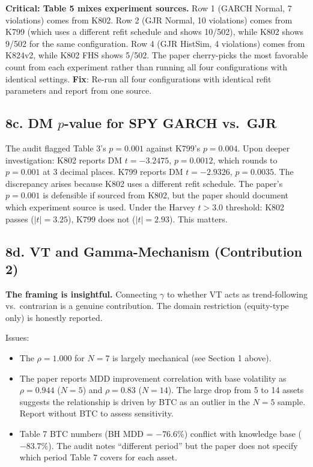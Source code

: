 \documentclass[12pt,a4paper]{article}
\begin{document}
\textcolor{errorred}{\textbf{Critical: Table 5 mixes experiment sources.}} Row 1 (GARCH Normal, 7 violations) comes from K802. Row 2 (GJR Normal, 10 violations) comes from K799 (which uses a different refit schedule and shows 10/502), while K802 shows 9/502 for the same configuration. Row 4 (GJR HistSim, 4 violations) comes from K824v2, while K802 FHS shows 5/502. The paper cherry-picks the most favorable count from each experiment rather than running all four configurations with identical settings. \textbf{Fix}: Re-run all four configurations with identical refit parameters and report from one source.

\subsection*{8c. DM $p$-value for SPY GARCH vs.\ GJR}

The audit flagged Table 3's $p = 0.001$ against K799's $p = 0.004$. Upon deeper investigation: K802 reports DM $t = -3.2475$, $p = 0.0012$, which rounds to $p = 0.001$ at 3 decimal places. K799 reports DM $t = -2.9326$, $p = 0.0035$. The discrepancy arises because K802 uses a different refit schedule. The paper's $p = 0.001$ is defensible if sourced from K802, but the paper should document which experiment source is used. Under the Harvey $t > 3.0$ threshold: K802 passes ($|t| = 3.25$), K799 does not ($|t| = 2.93$). This matters.

\subsection*{8d. VT and Gamma-Mechanism (Contribution 2)}

\textcolor{okgreen}{\textbf{The framing is insightful.}} Connecting $\gamma$ to whether VT acts as trend-following vs.\ contrarian is a genuine contribution. The domain restriction (equity-type only) is honestly reported.

Issues:
\begin{itemize}[nosep]
\item The $\rho = 1.000$ for $N = 7$ is largely mechanical (see Section 1 above).
\item The paper reports MDD improvement correlation with base volatility as $\rho = 0.944$ ($N = 5$) and $\rho = 0.83$ ($N = 14$). The large drop from 5 to 14 assets suggests the relationship is driven by BTC as an outlier in the $N = 5$ sample. Report without BTC to assess sensitivity.
\item Table 7 BTC numbers (BH MDD = $-76.6\%$) conflict with knowledge base ($-83.7\%$). The audit notes ``different period'' but the paper does not specify which period Table 7 covers for each asset.
\end{itemize}
\end{document}
